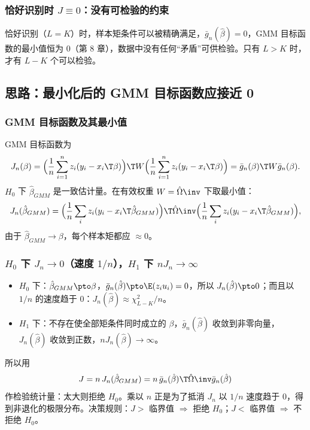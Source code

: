 \subsubsection{恰好识别时 \texorpdfstring{$J\equiv0$}{J=0}：没有可检验的约束}

恰好识别（$L=K$）时，样本矩条件可以被精确满足，$\bar g_n(\hat\beta)=0$，GMM 目标函数的最小值恒为 0（第 8 章），数据中没有任何“矛盾”可供检验。只有 $L>K$ 时，才有 $L-K$ 个可以检验。

\subsection{思路：最小化后的 GMM 目标函数应接近 0}

\subsubsection{GMM 目标函数及其最小值}

GMM 目标函数为
\[
J_n(\beta)=\Big(\frac1n\sum_{i=1}^nz_i(y_i-x_i\T\beta)\Big)\T W\Big(\frac1n\sum_{i=1}^nz_i(y_i-x_i\T\beta)\Big)=\bar g_n(\beta)\T W\bar g_n(\beta).
\]
$H_0$ 下 $\hat\beta_{GMM}$ 是一致估计量。在有效权重 $W=\hat\Omega\inv$ 下取最小值：
\[
J_n(\hat\beta_{GMM})=\Big(\frac1n\sum_iz_i(y_i-x_i\T\hat\beta_{GMM})\Big)\T\hat\Omega\inv\Big(\frac1n\sum_iz_i(y_i-x_i\T\hat\beta_{GMM})\Big),
\]
由于 $\hat\beta_{GMM}\to\beta$，每个样本矩都应 $\approx0$。

\subsubsection{\texorpdfstring{$H_0$}{H0} 下 \texorpdfstring{$J_n\to0$}{Jn->0}（速度 \texorpdfstring{$1/n$}{1/n}），\texorpdfstring{$H_1$}{H1} 下 \texorpdfstring{$nJ_n\to\infty$}{nJn->infinity}}

\begin{itemize}
  \item $H_0$ 下：$\hat\beta_{GMM}\pto\beta$，$\bar g_n(\hat\beta)\pto\E(z_iu_i)=0$，所以 $J_n(\hat\beta)\pto0$；而且以 $1/n$ 的速度趋于 0：$J_n(\hat\beta)\approx\chi^2_{L-K}/n$。
  \item $H_1$ 下：不存在使全部矩条件同时成立的 $\beta$，$\bar g_n(\hat\beta)$ 收敛到非零向量，$J_n(\hat\beta)$ 收敛到正数，$nJ_n(\hat\beta)\to\infty$。
\end{itemize}
所以用
\[
J=n\,J_n(\hat\beta_{GMM})=n\,\bar g_n(\hat\beta)\T\hat\Omega\inv\bar g_n(\hat\beta)
\]
作检验统计量：太大则拒绝 $H_0$。乘以 $n$ 正是为了抵消 $J_n$ 以 $1/n$ 速度趋于 0，得到非退化的极限分布。决策规则：$J>$ 临界值 $\Rightarrow$ 拒绝 $H_0$；$J<$ 临界值 $\Rightarrow$ 不拒绝 $H_0$。


